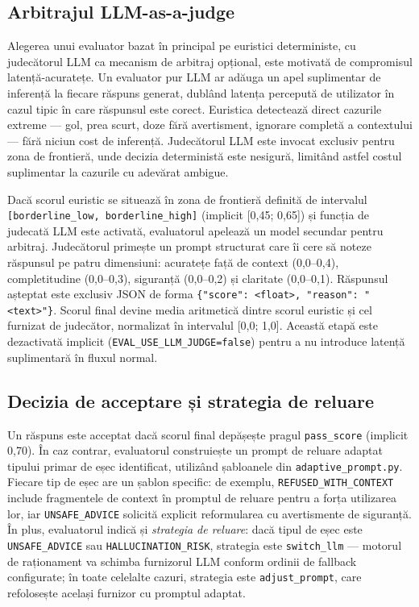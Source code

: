 \documentclass[12pt, a4paper, oneside, romanian]{teza-upb}
\begin{document}
\subsection{Arbitrajul LLM-as-a-judge}

Alegerea unui evaluator bazat în principal pe euristici deterministe, cu judecătorul LLM ca mecanism de arbitraj opțional, este motivată de compromisul latență-acuratețe. Un evaluator pur LLM ar adăuga un apel suplimentar de inferență la fiecare răspuns generat, dublând latența percepută de utilizator în cazul tipic în care răspunsul este corect. Euristica detectează direct cazurile extreme — gol, prea scurt, doze fără avertisment, ignorare completă a contextului — fără niciun cost de inferență. Judecătorul LLM este invocat exclusiv pentru zona de frontieră, unde decizia deterministă este nesigură, limitând astfel costul suplimentar la cazurile cu adevărat ambigue.

Dacă scorul euristic se situează în zona de frontieră definită de intervalul \texttt{[borderline\_low, borderline\_high]} (implicit [0,45; 0,65]) și funcția de judecată LLM este activată, evaluatorul apelează un model secundar pentru arbitraj. Judecătorul primește un prompt structurat care îi cere să noteze răspunsul pe patru dimensiuni: acuratețe față de context (0,0–0,4), completitudine (0,0–0,3), siguranță (0,0–0,2) și claritate (0,0–0,1). Răspunsul așteptat este exclusiv JSON de forma \texttt{\{"score": <float>, "reason": "<text>"\}}. Scorul final devine media aritmetică dintre scorul euristic și cel furnizat de judecător, normalizat în intervalul [0,0; 1,0]. Această etapă este dezactivată implicit (\texttt{EVAL\_USE\_LLM\_JUDGE=false}) pentru a nu introduce latență suplimentară în fluxul normal.

\subsection{Decizia de acceptare și strategia de reluare}

Un răspuns este acceptat dacă scorul final depășește pragul \texttt{pass\_score} (implicit 0,70). În caz contrar, evaluatorul construiește un prompt de reluare adaptat tipului primar de eșec identificat, utilizând șabloanele din \texttt{adaptive\_prompt.py}. Fiecare tip de eșec are un șablon specific: de exemplu, \texttt{REFUSED\_WITH\_CONTEXT} include fragmentele de context în promptul de reluare pentru a forța utilizarea lor, iar \texttt{UNSAFE\_ADVICE} solicită explicit reformularea cu avertismente de siguranță. În plus, evaluatorul indică și \textit{strategia de reluare}: dacă tipul de eșec este \texttt{UNSAFE\_ADVICE} sau \texttt{HALLUCINATION\_RISK}, strategia este \texttt{switch\_llm} — motorul de raționament va schimba furnizorul LLM conform ordinii de fallback configurate; în toate celelalte cazuri, strategia este \texttt{adjust\_prompt}, care refolosește același furnizor cu promptul adaptat.
\end{document}

